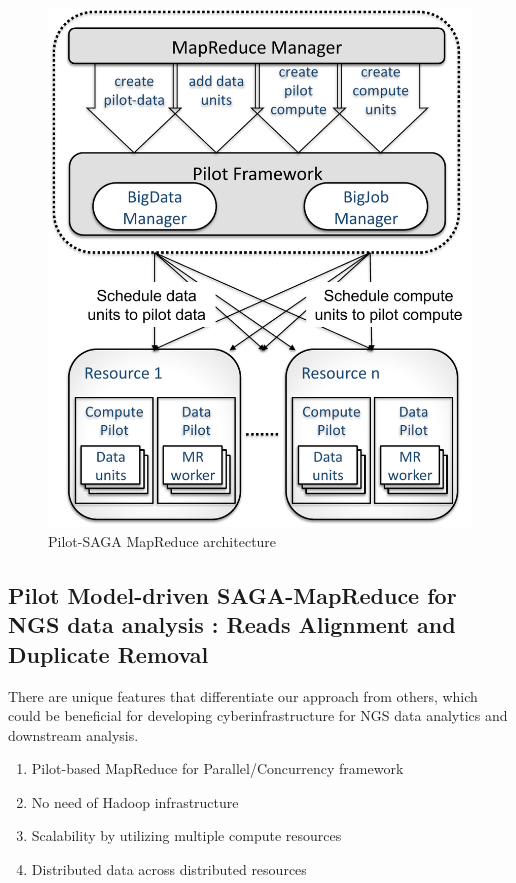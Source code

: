 \documentclass{sig-alternate}
\begin{document}
\begin{figure}
 \centering
\includegraphics[scale=0.45]{figures/F1.pdf} 
\caption{\small Pilot-SAGA MapReduce architecture}
  \label{fig:arch-pj-saga-mr} 
\end{figure}


\subsection{Pilot Model-driven SAGA-MapReduce for NGS data analysis : Reads Alignment and Duplicate Removal}

There are unique features that differentiate our approach from others, which could be beneficial for developing cyberinfrastructure for NGS data analytics and downstream analysis.  
\begin{enumerate}

\item Pilot-based MapReduce for Parallel/Concurrency framework 
\item No need of Hadoop infrastructure
\item Scalability by utilizing multiple compute resources
\item Distributed data across distributed resources
\end{enumerate}
 
\end{document}
